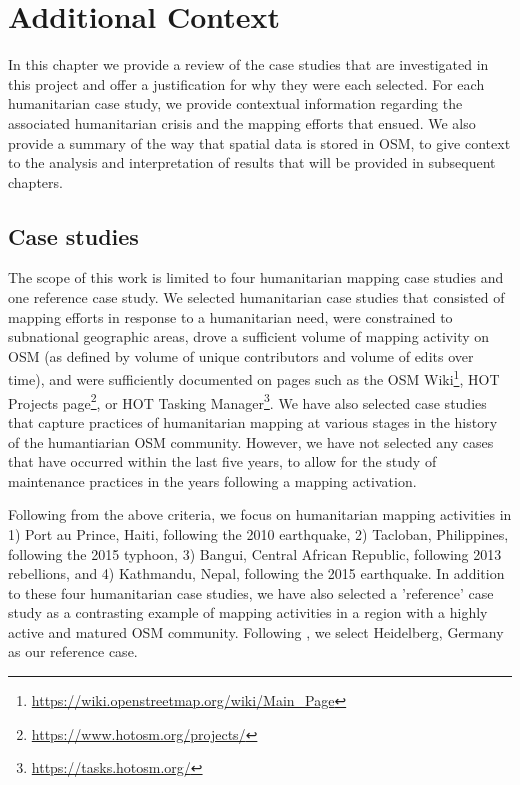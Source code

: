 \chapter{Additional Context}
\label{chapterlabel3}

In this chapter we provide a review of the case studies that are investigated in this project and offer a justification for why they were each selected. For each humanitarian case study, we provide contextual information regarding the associated humanitarian crisis and the mapping efforts that ensued. We also provide a summary of the way that spatial data is stored in OSM, to give context to the analysis and interpretation of results that will be provided in subsequent chapters.


\section{Case studies}

The scope of this work is limited to four humanitarian mapping case studies and one reference case study. We selected humanitarian case studies that consisted of mapping efforts in response to a humanitarian need, were constrained to subnational geographic areas, drove a sufficient volume of mapping activity on OSM (as defined by volume of unique contributors and volume of edits over time), and were sufficiently documented on pages such as the OSM Wiki\footnote{\url{https://wiki.openstreetmap.org/wiki/Main_Page}}, HOT Projects page\footnote{\url{https://www.hotosm.org/projects/}}, or HOT Tasking Manager\footnote{\url{https://tasks.hotosm.org/}}. We have also selected case studies that capture practices of humanitarian mapping at various stages in the history of the humantiarian OSM community. However, we have not selected any cases that have occurred within the last five years, to allow for the study of maintenance practices in the years following a mapping activation.  

Following from the above criteria, we focus on humanitarian mapping activities in 1) Port au Prince, Haiti, following the 2010 earthquake, 2) Tacloban, Philippines, following the 2015 typhoon, 3) Bangui, Central African Republic, following 2013 rebellions, and 4) Kathmandu, Nepal, following the 2015 earthquake. In addition to these four humanitarian case studies, we have also selected a 'reference' case study as a contrasting example of mapping activities in a region with a highly active and matured OSM community. Following \textcite{anderson_crowd_2018}, we select Heidelberg, Germany as our reference case. 

